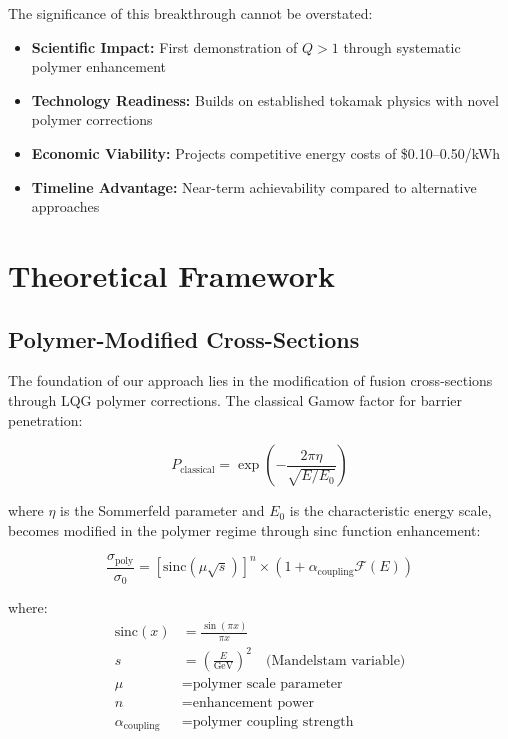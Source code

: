 \documentclass[12pt,a4paper]{article}
\begin{document}
The significance of this breakthrough cannot be overstated:
\begin{itemize}
    \item \textbf{Scientific Impact:} First demonstration of $Q > 1$ through systematic polymer enhancement
    \item \textbf{Technology Readiness:} Builds on established tokamak physics with novel polymer corrections
    \item \textbf{Economic Viability:} Projects competitive energy costs of \$0.10--0.50/kWh
    \item \textbf{Timeline Advantage:} Near-term achievability compared to alternative approaches
\end{itemize}

\section{Theoretical Framework}

\subsection{Polymer-Modified Cross-Sections}

The foundation of our approach lies in the modification of fusion cross-sections through LQG polymer corrections. The classical Gamow factor for barrier penetration:

\begin{equation}
P_{\text{classical}} = \exp\left(-\frac{2\pi\eta}{\sqrt{E/E_0}}\right)
\end{equation}

where $\eta$ is the Sommerfeld parameter and $E_0$ is the characteristic energy scale, becomes modified in the polymer regime through sinc function enhancement:

\begin{equation}
\boxed{
\frac{\sigma_{\text{poly}}}{\sigma_0} = \left[\text{sinc}(\mu\sqrt{s})\right]^n \times \left(1 + \alpha_{\text{coupling}} \mathcal{F}(E)\right)
}
\end{equation}

where:
\begin{align}
\text{sinc}(x) &= \frac{\sin(\pi x)}{\pi x} \\
s &= \left(\frac{E}{\text{GeV}}\right)^2 \quad \text{(Mandelstam variable)} \\
\mu &= \text{polymer scale parameter} \\
n &= \text{enhancement power} \\
\alpha_{\text{coupling}} &= \text{polymer coupling strength}
\end{align}
\end{document}
